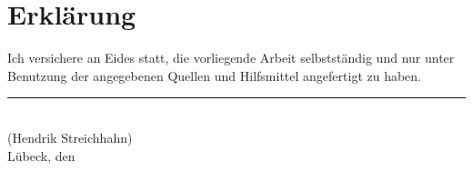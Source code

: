 
\cleardoublepage
\thispagestyle{plain}
\vspace*{\fill}

\section*{Erklärung}

Ich versichere an Eides statt, die vorliegende Arbeit selbstständig und nur unter Benutzung der angegebenen Quellen und Hilfsmittel angefertigt zu haben.

\vskip2cm

\rule{5cm}{0.4pt}\\
(Hendrik Streichhahn)\\
Lübeck, den \duedate